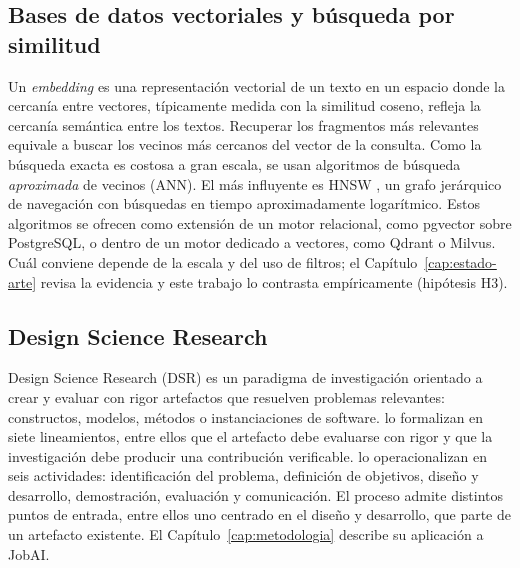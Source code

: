 \subsection{Bases de datos vectoriales y búsqueda por similitud}

Un \textit{embedding} es una representación vectorial de un texto en un espacio donde la cercanía entre vectores, típicamente medida con la similitud coseno, refleja la cercanía semántica entre los textos. Recuperar los fragmentos más relevantes equivale a buscar los vecinos más cercanos del vector de la consulta. Como la búsqueda exacta es costosa a gran escala, se usan algoritmos de búsqueda \emph{aproximada} de vecinos (ANN). El más influyente es HNSW \citep{Malkov2020}, un grafo jerárquico de navegación con búsquedas en tiempo aproximadamente logarítmico. Estos algoritmos se ofrecen como extensión de un motor relacional, como pgvector sobre PostgreSQL, o dentro de un motor dedicado a vectores, como Qdrant o Milvus. Cuál conviene depende de la escala y del uso de filtros; el Capítulo~\ref{cap:estado-arte} revisa la evidencia y este trabajo lo contrasta empíricamente (hipótesis H3).

\subsection{Design Science Research}
\label{sec:marco-teorico-dsr}

Design Science Research (DSR) es un paradigma de investigación orientado a crear y evaluar con rigor artefactos que resuelven problemas relevantes: constructos, modelos, métodos o instanciaciones de software. \citet{Hevner2004} lo formalizan en siete lineamientos, entre ellos que el artefacto debe evaluarse con rigor y que la investigación debe producir una contribución verificable. \citet{Peffers2007} lo operacionalizan en seis actividades: identificación del problema, definición de objetivos, diseño y desarrollo, demostración, evaluación y comunicación. El proceso admite distintos puntos de entrada, entre ellos uno centrado en el diseño y desarrollo, que parte de un artefacto existente. El Capítulo~\ref{cap:metodologia} describe su aplicación a JobAI.
